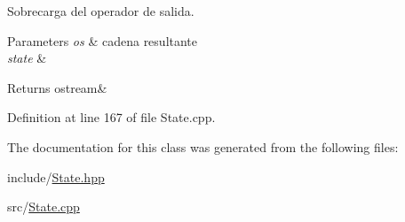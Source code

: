 Sobrecarga del operador de salida. 


\begin{DoxyParams}{Parameters}
{\em os} & cadena resultante \\
\hline
{\em state} & \\
\hline
\end{DoxyParams}
\begin{DoxyReturn}{Returns}
ostream\& 
\end{DoxyReturn}


Definition at line 167 of file State.\+cpp.



The documentation for this class was generated from the following files\+:\begin{DoxyCompactItemize}
\item 
include/\hyperlink{_state_8hpp}{State.\+hpp}\item 
src/\hyperlink{_state_8cpp}{State.\+cpp}\end{DoxyCompactItemize}
